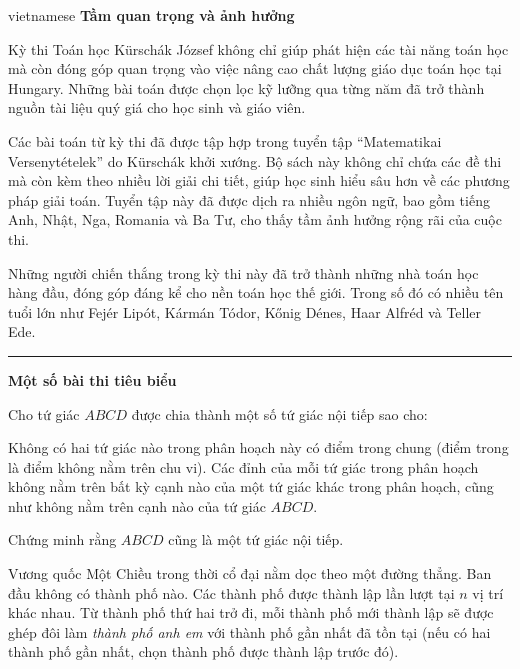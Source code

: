 \documentclass{article}
\begin{document}
\begin{otherlanguage*}{vietnamese}
\textbf{Tầm quan trọng và ảnh hưởng}

Kỳ thi Toán học Kürschák József không chỉ giúp phát hiện các tài năng toán học mà còn đóng góp quan trọng vào việc nâng cao chất lượng giáo dục toán học tại Hungary.
Những bài toán được chọn lọc kỹ lưỡng qua từng năm đã trở thành nguồn tài liệu quý giá cho học sinh và giáo viên.

Các bài toán từ kỳ thi đã được tập hợp trong tuyển tập “Matematikai Versenytételek” do Kürschák khởi xướng.
Bộ sách này không chỉ chứa các đề thi mà còn kèm theo nhiều lời giải chi tiết, giúp học sinh hiểu sâu hơn về các phương pháp giải toán.
Tuyển tập này đã được dịch ra nhiều ngôn ngữ, bao gồm tiếng Anh, Nhật, Nga, Romania và Ba Tư, cho thấy tầm ảnh hưởng rộng rãi của cuộc thi.

Những người chiến thắng trong kỳ thi này đã trở thành những nhà toán học hàng đầu, đóng góp đáng kể cho nền toán học thế giới.
Trong số đó có nhiều tên tuổi lớn như Fejér Lipót, Kármán Tódor, Kőnig Dénes, Haar Alfréd và Teller Ede.

\bigbreak

\noindent\rule{16.5cm}{0.4pt}

\textbf{Một số bài thi tiêu biểu}

\bigbreak

\begin{problem*}[2024, bài 1]
    Cho tứ giác \( ABCD \) được chia thành một số tứ giác nội tiếp sao cho:
    \begin{itemize}[topsep=0pt, partopsep=0pt, itemsep=0pt]
        \ii Không có hai tứ giác nào trong phân hoạch này có điểm trong chung (điểm trong là điểm không nằm trên chu vi).
        \ii Các đỉnh của mỗi tứ giác trong phân hoạch không nằm trên bất kỳ cạnh nào của một tứ giác khác trong phân hoạch, cũng như không nằm trên cạnh nào của tứ giác \( ABCD \).
    \end{itemize}
    Chứng minh rằng \( ABCD \) cũng là một tứ giác nội tiếp.
\end{problem*}

\begin{problem*}[2024, bài 2]
    Vương quốc Một Chiều trong thời cổ đại nằm dọc theo một đường thẳng. Ban đầu không có thành phố nào. Các thành phố được thành lập lần lượt tại \( n \) vị trí khác nhau.  
    Từ thành phố thứ hai trở đi, mỗi thành phố mới thành lập sẽ được ghép đôi làm \textit{thành phố anh em} với thành phố gần nhất đã tồn tại (nếu có hai thành phố gần nhất,
    chọn thành phố được thành lập trước đó).  


\end{problem*}
\end{otherlanguage*}
\end{document}
